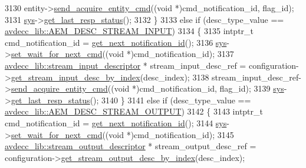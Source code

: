 \begin{DoxyCode}
3130         entity->\hyperlink{classavdecc__lib_1_1descriptor__base_adfd0cf2a51bff7d762b0efc743480c48}{send\_acquire\_entity\_cmd}((\textcolor{keywordtype}{void} *)cmd\_notification\_id, flag\_id);
3131         \hyperlink{classcmd__line_a485db4800e331cb4052c447fdf5d154e}{sys}->\hyperlink{classavdecc__lib_1_1system_aa63e8d1a4e51f695cdcccc9340922407}{get\_last\_resp\_status}();
3132     \}
3133     \textcolor{keywordflow}{else} \textcolor{keywordflow}{if} (desc\_type\_value == \hyperlink{namespaceavdecc__lib_ac7b7d227e46bc72b63ee9e9aae15902fa00d002e47651a1b007d50f9f2da51e53}{avdecc\_lib::AEM\_DESC\_STREAM\_INPUT})
3134     \{
3135         intptr\_t cmd\_notification\_id = \hyperlink{classcmd__line_a57486218387d1aa9d262eb7c176154ad}{get\_next\_notification\_id}();
3136         \hyperlink{classcmd__line_a485db4800e331cb4052c447fdf5d154e}{sys}->\hyperlink{classavdecc__lib_1_1system_a26b769584f10225077da47583edda33e}{set\_wait\_for\_next\_cmd}((\textcolor{keywordtype}{void} *)cmd\_notification\_id);
3137         \hyperlink{classavdecc__lib_1_1stream__input__descriptor}{avdecc\_lib::stream\_input\_descriptor} * stream\_input\_desc\_ref = 
      configuration->\hyperlink{classavdecc__lib_1_1configuration__descriptor_a69cfe9032cea21937b4153878f8a925c}{get\_stream\_input\_desc\_by\_index}(desc\_index);
3138         stream\_input\_desc\_ref->\hyperlink{classavdecc__lib_1_1descriptor__base_adfd0cf2a51bff7d762b0efc743480c48}{send\_acquire\_entity\_cmd}((\textcolor{keywordtype}{void} *)cmd\_notification\_id, 
      flag\_id);
3139         \hyperlink{classcmd__line_a485db4800e331cb4052c447fdf5d154e}{sys}->\hyperlink{classavdecc__lib_1_1system_aa63e8d1a4e51f695cdcccc9340922407}{get\_last\_resp\_status}();
3140     \}
3141     \textcolor{keywordflow}{else} \textcolor{keywordflow}{if} (desc\_type\_value == \hyperlink{namespaceavdecc__lib_ac7b7d227e46bc72b63ee9e9aae15902fa3e5e9421e49598854000feaa2fe71464}{avdecc\_lib::AEM\_DESC\_STREAM\_OUTPUT})
3142     \{
3143         intptr\_t cmd\_notification\_id = \hyperlink{classcmd__line_a57486218387d1aa9d262eb7c176154ad}{get\_next\_notification\_id}();
3144         \hyperlink{classcmd__line_a485db4800e331cb4052c447fdf5d154e}{sys}->\hyperlink{classavdecc__lib_1_1system_a26b769584f10225077da47583edda33e}{set\_wait\_for\_next\_cmd}((\textcolor{keywordtype}{void} *)cmd\_notification\_id);
3145         \hyperlink{classavdecc__lib_1_1stream__output__descriptor}{avdecc\_lib::stream\_output\_descriptor} * stream\_output\_desc\_ref =
       configuration->\hyperlink{classavdecc__lib_1_1configuration__descriptor_a300ea5957342e2e9579318135da02856}{get\_stream\_output\_desc\_by\_index}(desc\_index);

\end{DoxyCode}

